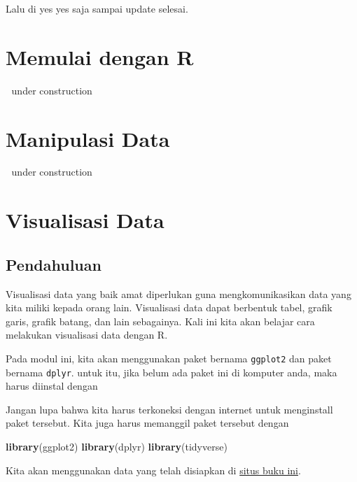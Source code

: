 \documentclass[
]{book}
\newenvironment{Shaded}{\begin{snugshade}}{\end{snugshade}}
\newcommand{\CommentTok}[1]{\textcolor[rgb]{0.56,0.35,0.01}{\textit{#1}}}
\newcommand{\KeywordTok}[1]{\textcolor[rgb]{0.13,0.29,0.53}{\textbf{#1}}}
\newcommand{\NormalTok}[1]{#1}
\newcommand{\OperatorTok}[1]{\textcolor[rgb]{0.81,0.36,0.00}{\textbf{#1}}}
\newcommand{\StringTok}[1]{\textcolor[rgb]{0.31,0.60,0.02}{#1}}
\begin{document}
Lalu di yes yes saja sampai update selesai.

\hypertarget{intro}{%
\chapter{Memulai dengan R}\label{intro}}

🚧 under construction 🚧

\hypertarget{manipulasi-data}{%
\chapter{Manipulasi Data}\label{manipulasi-data}}

🚧 under construction 🚧

\hypertarget{visualisasi-data}{%
\chapter{Visualisasi Data}\label{visualisasi-data}}

\hypertarget{pendahuluan}{%
\section{Pendahuluan}\label{pendahuluan}}

Visualisasi data yang baik amat diperlukan guna mengkomunikasikan data yang kita miliki kepada orang lain. Visualisasi data dapat berbentuk tabel, grafik garis, grafik batang, dan lain sebagainya. Kali ini kita akan belajar cara melakukan visualisasi data dengan R.

Pada modul ini, kita akan menggunakan paket bernama \texttt{ggplot2} dan paket bernama \texttt{dplyr}. untuk itu, jika belum ada paket ini di komputer anda, maka harus diinstal dengan

Jangan lupa bahwa kita harus terkoneksi dengan internet untuk menginstall paket tersebut. Kita juga harus memanggil paket tersebut dengan

\begin{Shaded}
\begin{Highlighting}[]
\KeywordTok{library}\NormalTok{(ggplot2)}
\KeywordTok{library}\NormalTok{(dplyr)}
\KeywordTok{library}\NormalTok{(tidyverse)}
\end{Highlighting}
\end{Shaded}

Kita akan menggunakan data yang telah disiapkan di \href{https://imedkrisna.github.io/r/docs/index.html}{situs buku ini}.

\begin{Shaded}
\end{Shaded}
\end{document}

